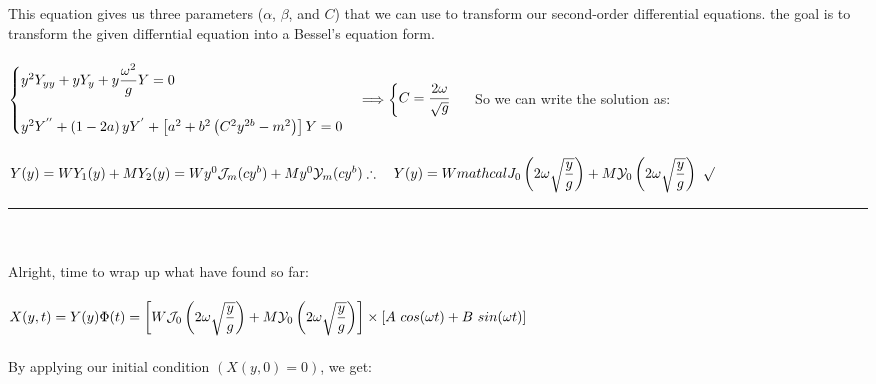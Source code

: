 \documentclass[fleqn]{article}
\begin{document}
\begin{enumerate}
\begin{enumerate}
{          \\
          \\
          This equation gives us three parameters ($\alpha$, $\beta$, and $C$) that we can use to transform our
          second-order differential equations. the goal is to transform the given differntial equation into
          a Bessel’s equation form. \\
          \\
          $
            \begin{cases}
              y^2 Y_{yy}+yY_y+y\dfrac{\omega^2}{g}Y=0 \\
              \\
              y^2 Y^{''}+\left(1-2a\right)y Y^{'}+\left[a^2+b^2\left(C^2 y^{2b}-m^2\right)\right]Y=0
            \end{cases} \Longrightarrow \begin{cases}
              C=\dfrac{2 \omega}{\sqrt{g}}
            \end{cases} \\
            \\
            \\
          $
          So we can write the solution as: \\
          \\
          $
            Y(y)=W Y_1(y)+M Y_2(y)=W y^0 \mathcal{J}_m(cy^b) +M y^0 \mathcal{Y}_m(cy^b) \\
            \\
            \\
            \therefore ~~~ Y(y)=W mathcal{J}_0 \left(2 \omega \sqrt{\dfrac{y}{g}}\right)+M \mathcal{Y}_0 \left(2 \omega \sqrt{\dfrac{y}{g}}\right) ~ \surd \\
          $
          \\
          \rule{15cm}{1pt} \\
          \\
          Alright, time to wrap up what have found so far: \\
          \\
          $
            X(y,t)=Y(y)\Phi(t)=\left[W \mathcal{J}_0 \left(2 \omega \sqrt{\dfrac{y}{g}}\right)+M \mathcal{Y}_0 \left(2 \omega \sqrt{\dfrac{y}{g}}\right)\right] \times \left[A ~ cos(\omega t)+B ~ sin(\omega t)\right] \\
          $
          \\
          \\
          By applying our initial condition $(X(y,0)=0)$, we get: \\
}
\end{enumerate}
\end{enumerate}
\end{document}
